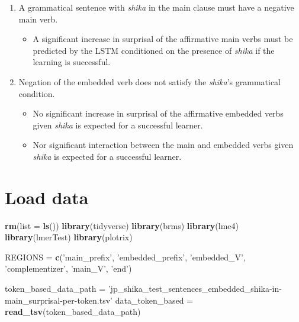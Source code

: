 \documentclass[]{ltjsarticle}
\newenvironment{Shaded}{\begin{snugshade}}{\end{snugshade}}
\newcommand{\KeywordTok}[1]{\textcolor[rgb]{0.13,0.29,0.53}{\textbf{#1}}}
\newcommand{\DataTypeTok}[1]{\textcolor[rgb]{0.13,0.29,0.53}{#1}}
\newcommand{\StringTok}[1]{\textcolor[rgb]{0.31,0.60,0.02}{#1}}
\newcommand{\NormalTok}[1]{#1}
\providecommand{\tightlist}{%
  \setlength{\itemsep}{0pt}\setlength{\parskip}{0pt}}
\begin{document}
\begin{enumerate}
\def\labelenumi{\arabic{enumi}.}
\tightlist
\item
  A grammatical sentence with \emph{shika} in the main clause must have
  a negative main verb.

  \begin{itemize}
  \tightlist
  \item
    A significant increase in surprisal of the affirmative main verbs
    must be predicted by the LSTM conditioned on the presence of
    \emph{shika} if the learning is successful.
  \end{itemize}
\item
  Negation of the embedded verb does not satisfy the \emph{shika}'s
  grammatical condition.

  \begin{itemize}
  \tightlist
  \item
    No significant increase in surprisal of the affirmative embedded
    verbs given \emph{shika} is expected for a successful learner.
  \item
    Nor significant interaction between the main and embedded verbs
    given \emph{shika} is expected for a successful learner.
  \end{itemize}
\end{enumerate}

\section{Load data}\label{load-data}

\begin{Shaded}
\begin{Highlighting}[]
\KeywordTok{rm}\NormalTok{(}\DataTypeTok{list =} \KeywordTok{ls}\NormalTok{())}
\KeywordTok{library}\NormalTok{(tidyverse)}
\KeywordTok{library}\NormalTok{(brms)}
\KeywordTok{library}\NormalTok{(lme4)}
\KeywordTok{library}\NormalTok{(lmerTest)}
\KeywordTok{library}\NormalTok{(plotrix)}

\NormalTok{REGIONS =}\StringTok{ }\KeywordTok{c}\NormalTok{(}\StringTok{'main_prefix'}\NormalTok{, }\StringTok{'embedded_prefix'}\NormalTok{, }\StringTok{'embedded_V'}\NormalTok{, }\StringTok{'complementizer'}\NormalTok{, }\StringTok{'main_V'}\NormalTok{, }\StringTok{'end'}\NormalTok{)}

\NormalTok{token_based_data_path =}\StringTok{ 'jp_shika_test_sentences_embedded_shika-in-main_surprisal-per-token.tsv'}
\NormalTok{data_token_based =}\StringTok{ }\KeywordTok{read_tsv}\NormalTok{(token_based_data_path)}
\end{Highlighting}
\end{Shaded}
\end{document}
